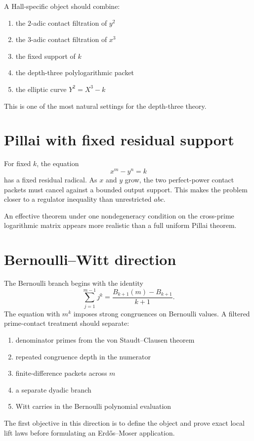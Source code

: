 A Hall-specific object should combine:

\begin{enumerate}[leftmargin=1.5em]
\item the $2$-adic contact filtration of $y^2$
\item the $3$-adic contact filtration of $x^3$
\item the fixed support of $k$
\item the depth-three polylogarithmic packet
\item the elliptic curve $Y^2=X^3-k$
\end{enumerate}

This is one of the most natural settings for the depth-three theory.

\section{Pillai with fixed residual support}
For fixed $k$, the equation
\[
 x^m-y^n=k
\]
has a fixed residual radical. As $x$ and $y$ grow, the two perfect-power contact packets must cancel against a bounded output support. This makes the problem closer to a regulator inequality than unrestricted $abc$.

An effective theorem under one nondegeneracy condition on the cross-prime logarithmic matrix appears more realistic than a full uniform Pillai theorem.

\section{Bernoulli--Witt direction}
The Bernoulli branch begins with the identity
\[
 \sum_{j=1}^{m-1}j^k
 =
 \frac{B_{k+1}(m)-B_{k+1}}{k+1}.
\]
The equation with $m^k$ imposes strong congruences on Bernoulli values. A filtered prime-contact treatment should separate:

\begin{enumerate}[leftmargin=1.5em]
\item denominator primes from the von Staudt--Clausen theorem
\item repeated congruence depth in the numerator
\item finite-difference packets across $m$
\item a separate dyadic branch
\item Witt carries in the Bernoulli polynomial evaluation
\end{enumerate}

The first objective in this direction is to define the object and prove exact local lift laws before formulating an Erd\H{o}s--Moser application.

